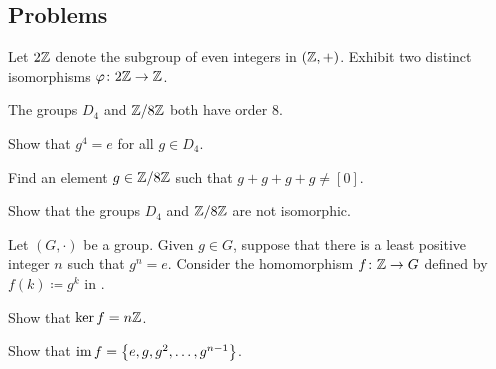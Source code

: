 \documentclass[../notes.tex]{subfiles}
\begin{document}
\subsection{Problems}


\begin{homework}
    Let $2\mathbb Z$ denote the subgroup of even integers in $(\mathbb Z,+)$. Exhibit two distinct isomorphisms $\varphi\colon2\mathbb Z\to\mathbb Z$.
\end{homework}

\begin{homework} \label{prob:groups-of-order-8}
    The groups $D_4$ and $\mathbb Z/8\mathbb Z$ both have order $8$.
    \begin{listalph}
        \item Show that $g^4=e$ for all $g\in D_4$.
        \item Find an element $g\in\mathbb Z/8\mathbb Z$ such that $g+g+g+g\ne[0]$.
        \item Show that the groups $D_4$ and $\mathbb Z/8\mathbb Z$ are not isomorphic.
    \end{listalph}
\end{homework}

\begin{homework}
    Let $(G,\cdot)$ be a group. Given $g\in G$, suppose that there is a least positive integer $n$ such that $g^n=e$. Consider the homomorphism $f\colon\mathbb Z\to G$ defined by $f(k)\coloneqq g^k$ in .
    \begin{listalph}
        \item Show that $\ker f=n\mathbb Z$.
        \item Show that $\operatorname{im} f=\left\{e,g,g^2,\ldots,g^{n-1}\right\}$.
    \end{listalph}
\end{homework}
\end{document}
